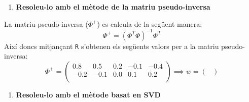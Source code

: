 \documentclass[a4paper]{article}
\begin{document}
\begin{enumerate}[resume]
	\item \textbf{Resoleu-lo amb el mètode de la matriu pseudo-inversa}
\end{enumerate}
La matriu pseudo-inversa ($\Phi^+$) es calcula de la següent manera:
$$
\Phi^+ = (\Phi^T\Phi)^{-1}\Phi^T
$$
Així doncs mitjançant \texttt{R} s'obtenen els següents valors per a la matriu pseudo-inversa:
$$
\Phi^+ =
\begin{pmatrix}
0.8 & 0.5 & 0.2 & -0.1 & -0.4\\
-0.2 & -0.1 & 0.0 & 0.1 & 0.2\\
\end{pmatrix}
\implies 
w = 
\begin{pmatrix}

\end{pmatrix}
$$

\begin{enumerate}[resume]
	\item \textbf{Resoleu-lo amb el mètode basat en SVD}
\end{enumerate}
\end{document}
